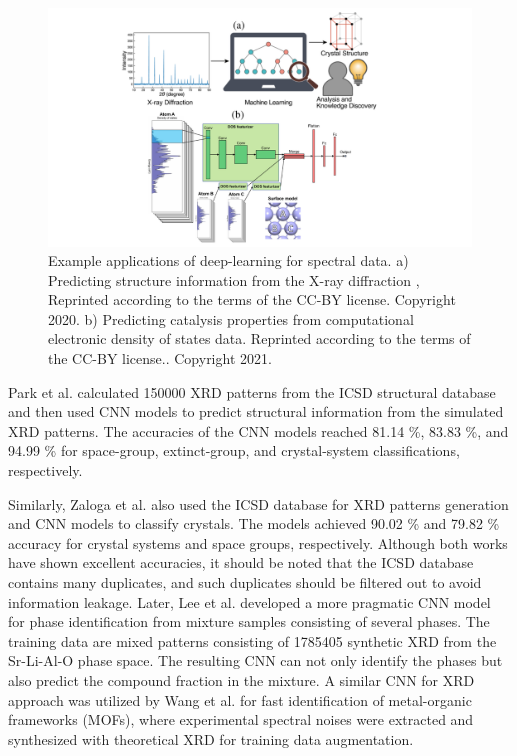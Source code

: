 \documentclass[pdflatex,sn-mathphys]{sn-jnl}%
\theoremstyle{thmstyleone}%
\theoremstyle{thmstyletwo}%
\theoremstyle{thmstylethree}%
\begin{document}
\begin{figure}
    \centering
    \includegraphics[width=1.0\textwidth]{Figures/Fig3.pdf}
    \caption{Example applications of deep-learning for spectral data. a) Predicting structure information from the X-ray diffraction \cite{suzukiSymmetryPredictionKnowledge2020},  Reprinted according to the terms of the CC-BY license.\cite{suzukiSymmetryPredictionKnowledge2020} Copyright 2020. b) Predicting catalysis properties from computational electronic density of states data. Reprinted according to the terms of the CC-BY license.\cite{fungMachineLearnedFeatures2021}. Copyright 2021.}
    \label{fig:spectra_model}
\end{figure}

Park et al. \cite{parkClassificationCrystalStructure2017} calculated 150000 XRD patterns from the ICSD structural database \cite{hellenbrandtInorganicCrystalStructure2004} and then used CNN models to predict structural information from the simulated XRD patterns. The accuracies of the CNN models reached 81.14 \%, 83.83 \%, and 94.99 \% for space-group, extinct-group, and crystal-system classifications, respectively. 

Similarly, Zaloga et al. \cite{zalogaCrystalSymmetryClassification2020} also used the ICSD database for XRD patterns generation and CNN models to classify crystals. The models achieved 90.02 \% and 79.82 \% accuracy for crystal systems and space groups, respectively. Although both works have shown excellent accuracies, it should be noted that the ICSD database contains many duplicates, and such duplicates should be filtered out to avoid information leakage. Later, Lee et al. \cite{leeDeeplearningTechniquePhase2020} developed a more pragmatic CNN model for phase identification from mixture samples consisting of several phases. The training data are mixed patterns consisting of 1785405 synthetic XRD from the Sr-Li-Al-O phase space. The resulting CNN can not only identify the phases but also predict the compound fraction in the mixture. A similar CNN for XRD approach was utilized by Wang et al. \cite{wangRapidIdentificationXray2020} for fast identification of metal-organic frameworks (MOFs), where experimental spectral noises were extracted and synthesized with theoretical XRD for training 
data augmentation.
\end{document}
